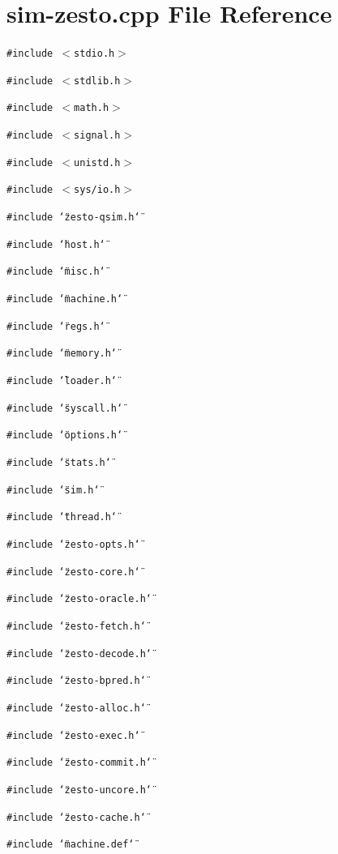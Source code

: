 \section{sim-zesto.cpp File Reference}
\label{sim-zesto_8cpp}
{\tt \#include $<$stdio.h$>$}\par
{\tt \#include $<$stdlib.h$>$}\par
{\tt \#include $<$math.h$>$}\par
{\tt \#include $<$signal.h$>$}\par
{\tt \#include $<$unistd.h$>$}\par
{\tt \#include $<$sys/io.h$>$}\par
{\tt \#include \char`\"{}zesto-qsim.h\char`\"{}}\par
{\tt \#include \char`\"{}host.h\char`\"{}}\par
{\tt \#include \char`\"{}misc.h\char`\"{}}\par
{\tt \#include \char`\"{}machine.h\char`\"{}}\par
{\tt \#include \char`\"{}regs.h\char`\"{}}\par
{\tt \#include \char`\"{}memory.h\char`\"{}}\par
{\tt \#include \char`\"{}loader.h\char`\"{}}\par
{\tt \#include \char`\"{}syscall.h\char`\"{}}\par
{\tt \#include \char`\"{}options.h\char`\"{}}\par
{\tt \#include \char`\"{}stats.h\char`\"{}}\par
{\tt \#include \char`\"{}sim.h\char`\"{}}\par
{\tt \#include \char`\"{}thread.h\char`\"{}}\par
{\tt \#include \char`\"{}zesto-opts.h\char`\"{}}\par
{\tt \#include \char`\"{}zesto-core.h\char`\"{}}\par
{\tt \#include \char`\"{}zesto-oracle.h\char`\"{}}\par
{\tt \#include \char`\"{}zesto-fetch.h\char`\"{}}\par
{\tt \#include \char`\"{}zesto-decode.h\char`\"{}}\par
{\tt \#include \char`\"{}zesto-bpred.h\char`\"{}}\par
{\tt \#include \char`\"{}zesto-alloc.h\char`\"{}}\par
{\tt \#include \char`\"{}zesto-exec.h\char`\"{}}\par
{\tt \#include \char`\"{}zesto-commit.h\char`\"{}}\par
{\tt \#include \char`\"{}zesto-uncore.h\char`\"{}}\par
{\tt \#include \char`\"{}zesto-cache.h\char`\"{}}\par
{\tt \#include \char`\"{}machine.def\char`\"{}}\par


